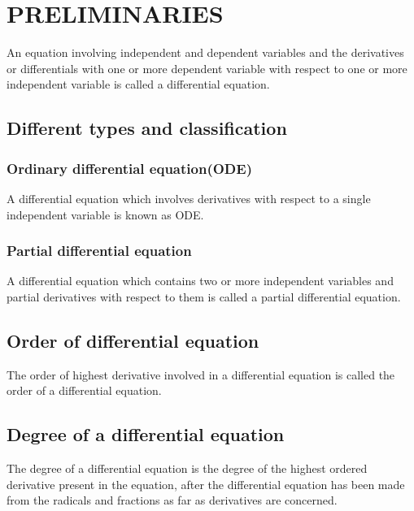 \chapter*{\textbf{PRELIMINARIES}}
\thispagestyle{empty}
 
 
 

 
 \par An equation involving independent and dependent variables and the derivatives or differentials with one or more dependent variable with respect to one or more independent variable is called a differential equation.
%
%
\section*{Different types and classification}
\subsection*{Ordinary differential equation(ODE)} 
 \par A differential equation which involves derivatives with respect to a single independent variable is known as ODE.
\subsection*{Partial differential equation} \par A differential equation which contains two or more independent variables and partial derivatives with respect to them is called a partial differential equation.
\section*{Order of differential equation}                                      
\par The order of highest derivative involved in a   differential equation is called the order of a differential equation.
 
\section*{Degree of a differential equation}
 \par The degree of a differential equation is the degree of the highest ordered derivative present in the equation, after the differential equation has been made from the radicals and fractions as far as derivatives are concerned.
 
